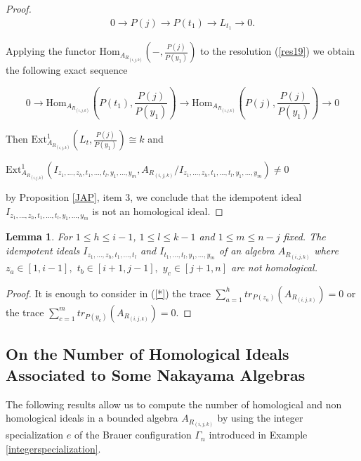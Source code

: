 \documentclass[10pt,twoside]{article}
\newtheorem{lema}{Lemma}
\theoremstyle{definition}
\begin{document}
\begin{proof}
\begin{equation}\label{res19}
\begin{split}
0 \to P(j) \to P(t_1) \to L_{t_1} \to 0.
\end{split}
\end{equation}

Applying the functor $ \textrm{Hom}_{A_{R_{(i, j, k)}}}\left( -,\frac{P(j)}{P(y_1)}\right) $ to the resolution (\ref{res19}) we obtain the following exact sequence

\[
0 \to  \textrm{Hom}_{A_{R_{(i, j, k)}}}\left( P(t_1),\frac{P(j)}{P(y_1)}\right)  \to  \textrm{Hom}_{A_{R_{(i, j, k)}}}\left( P(j),\frac{P(j)}{P(y_1)}\right)  \to 0
\]\par\smallskip

Then $\textrm{Ext}^{1}_{A_{R_{(i, j, k)}}}\left( L_t,\frac{P(j)}{P(y_1)}\right)  \cong k$ and\par\smallskip
\begin{centering}
 $\textrm{Ext}^{1}_{A_{R_{(i, j, k)}}}(I_{z_1,\ldots, z_h, t_1, \ldots ,t_l, y_1,\ldots , y_m},A_{R_{(i, j, k)}}/I_{z_1,\ldots, z_h, t_1, \ldots ,t_l, y_1,\ldots , y_m}) \not= 0$\par\smallskip
\end{centering}
 
 
 by Proposition \ref{JAP}, item 3, we conclude that the idempotent ideal $I_{z_1,\ldots, z_h, t_1, \ldots ,t_l, y_1,\ldots , y_m}$ is not an homological ideal.
\end{proof}

\begin{lema}\label{last}
For $1\leq h \leq i-1$, $1\leq l \leq k-1$ and $1\leq m \leq n-j$ fixed. The idempotent ideals $I_{z_1,\ldots,z_h, t_1, \ldots ,t_l}$ and $I_{t_1, \ldots ,t_l, y_1, \ldots , y_m }$  of an algebra $A_{R_{(i, j, k)}}$ where $z_a \in [1,i-1],$  $t_b \in [i+1, j-1],$ $y_c\in [j+1,n]$ are not homological.
\end{lema}

\begin{proof}
It is enough to consider in (\ref{*}) the trace
$\displaystyle \sum_{a=1}^{h}tr_{P(z_a)}(A_{R_{(i, j, k)}})=0$  or the trace  $\displaystyle \sum_{c=1}^{m}tr_{P(y_c)}(A_{R_{(i, j, k)}})=0$.
\end{proof}










\subsection{On the Number of Homological Ideals Associated to Some Nakayama Algebras}
The following results allow us to compute the number of homological and non homological ideals in a bounded algebra $A_{R_{(i, j, k)}}$ by using the integer specialization $e$ of the Brauer configuration $\Gamma_n$ introduced in Example \ref{integerspecialization}.
\end{document}
